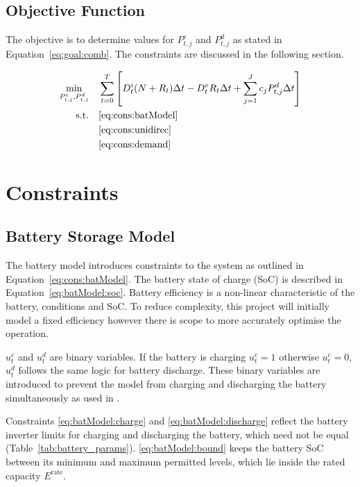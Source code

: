 \subsection{Objective Function}
The objective is to determine values for $P^c_{t,j}$ and $P^d_{t,j}$ as stated in Equation~\ref{eq:goal:comb}. The constraints are discussed in the following section.

\begin{align}
    \min_{P^c_{t,j},P^d_{t,j}} \quad & \sum_{t=0}^{T} \left[ D^i_t (N+R_t)\Delta t - D_t^e R_t\Delta t + \sum_{j=1}^{J} c_j P^d_{t,j} \Delta t \right] \label{eq:goal:comb}\\
    \text{s.t.} \quad & \eqref{eq:cons:batModel} \nonumber\\
                      & \eqref{eq:cons:unidirec} \nonumber\\
                      & \eqref{eq:cons:demand} \nonumber
\end{align}


\section{Constraints}

\subsection{Battery Storage Model}
The battery model introduces constraints to the system as outlined in Equation~\ref{eq:cons:batModel}. The battery state of charge (SoC) is described in Equation~\ref{eq:batModel:soc}. Battery efficiency is a non-linear characteristic of the battery, conditions and SoC. To reduce complexity, this project will initially model a fixed efficiency however there is scope to more accurately optimise the operation.

$u^c_t$ and $u^d_t$ are binary variables. If the battery is charging $u^c_t = 1$ otherwise $u^c_t = 0$, $u^d_t$ follows the same logic for battery discharge. These binary variables are introduced to prevent the model from charging and discharging the battery simultaneously as used in \cite{Cao2020}.

Constraints \ref{eq:batModel:charge} and \ref{eq:batModel:discharge} reflect the battery inverter limits for charging and discharging the battery, which need not be equal (Table~\ref{tab:battery_params}). \ref{eq:batModel:bound} keeps the battery SoC between its minimum and maximum permitted levels, which lie inside the rated capacity $E^{\text{rate}}$.

